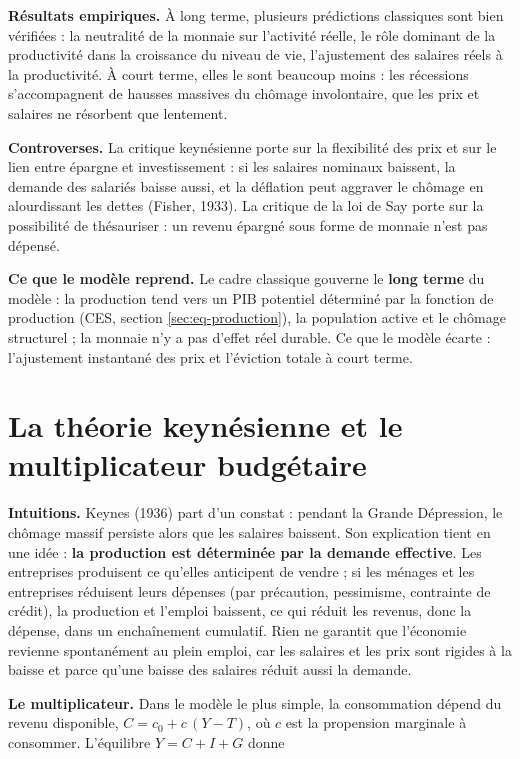 \documentclass[
  11pt,
  11pt,
  a4paper,
  openany]{book}
\begin{document}
\textbf{Résultats empiriques.} À long terme, plusieurs prédictions
classiques sont bien vérifiées : la neutralité de la monnaie sur
l'activité réelle, le rôle dominant de la productivité dans la
croissance du niveau de vie, l'ajustement des salaires réels à la
productivité. À court terme, elles le sont beaucoup moins : les
récessions s'accompagnent de hausses massives du chômage involontaire,
que les prix et salaires ne résorbent que lentement.

\textbf{Controverses.} La critique keynésienne porte sur la flexibilité
des prix et sur le lien entre épargne et investissement : si les
salaires nominaux baissent, la demande des salariés baisse aussi, et la
déflation peut aggraver le chômage en alourdissant les dettes (Fisher,
1933). La critique de la loi de Say porte sur la possibilité de
thésauriser : un revenu épargné sous forme de monnaie n'est pas dépensé.

\textbf{Ce que le modèle reprend.} Le cadre classique gouverne le
\textbf{long terme} du modèle : la production tend vers un PIB potentiel
déterminé par la fonction de production (CES, section
\ref{sec:eq-production}), la population active et le chômage structurel
; la monnaie n'y a pas d'effet réel durable. Ce que le modèle écarte :
l'ajustement instantané des prix et l'éviction totale à court terme.

\hypertarget{sec:keynes}{%
\section{La théorie keynésienne et le multiplicateur
budgétaire}\label{sec:keynes}}

\textbf{Intuitions.} Keynes (1936) part d'un constat : pendant la Grande
Dépression, le chômage massif persiste alors que les salaires baissent.
Son explication tient en une idée : \textbf{la production est déterminée
par la demande effective}. Les entreprises produisent ce qu'elles
anticipent de vendre ; si les ménages et les entreprises réduisent leurs
dépenses (par précaution, pessimisme, contrainte de crédit), la
production et l'emploi baissent, ce qui réduit les revenus, donc la
dépense, dans un enchaînement cumulatif. Rien ne garantit que l'économie
revienne spontanément au plein emploi, car les salaires et les prix sont
rigides à la baisse et parce qu'une baisse des salaires réduit aussi la
demande.

\textbf{Le multiplicateur.} Dans le modèle le plus simple, la
consommation dépend du revenu disponible, \(C = c_0 + c\,(Y - T)\), où
\(c\) est la propension marginale à consommer. L'équilibre
\(Y = C + I + G\) donne
\end{document}
